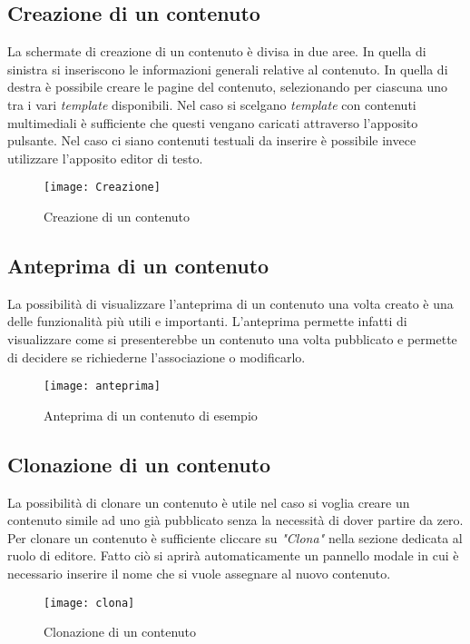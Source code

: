 \subsection{Creazione di un contenuto}
La schermate di creazione di un contenuto è divisa in due aree. In quella di sinistra si inseriscono le informazioni generali relative al contenuto. In quella di destra è possibile creare le pagine del contenuto, selezionando per ciascuna uno tra i vari \textit{template} disponibili.
Nel caso si scelgano \textit{template} con contenuti multimediali è sufficiente che questi vengano caricati attraverso l'apposito pulsante. Nel caso ci siano contenuti testuali da inserire è possibile invece utilizzare l'apposito editor di testo.
\begin{figure}[h]
    \begin{center}
    \texttt{[image: Creazione]}
    \caption{Creazione di un contenuto}
    \label{fig:figure24}
    \end{center}
\end{figure}

\subsection{Anteprima di un contenuto}
La possibilità di visualizzare l'anteprima di un contenuto una volta creato è una delle funzionalità più utili e importanti. L'anteprima permette infatti di visualizzare come si presenterebbe un contenuto una volta pubblicato e permette di decidere se richiederne l'associazione o modificarlo.
\begin{figure}[h]
    \begin{center}
    \texttt{[image: anteprima]}
    \caption{Anteprima di un contenuto di esempio}
    \label{fig:figure25}
    \end{center}
\end{figure}

\subsection{Clonazione di un contenuto}
La possibilità di clonare un contenuto è utile nel caso si voglia creare un contenuto simile ad uno già pubblicato senza la necessità di dover partire da zero. Per clonare un contenuto è sufficiente cliccare su \textit{"Clona"} nella sezione dedicata al ruolo di editore. Fatto ciò si aprirà automaticamente un pannello modale in cui è necessario inserire il nome che si vuole assegnare al nuovo contenuto.
\begin{figure}[h]
    \begin{center}
    \texttt{[image: clona]}
    \caption{Clonazione di un contenuto}
    \label{fig:figure26}
    \end{center}
\end{figure}

